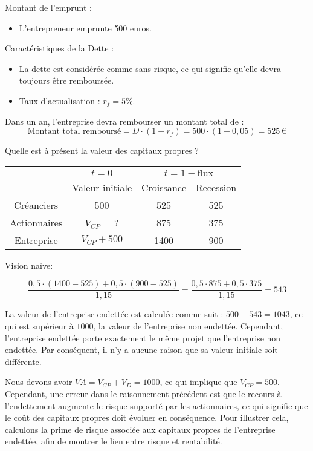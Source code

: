 \documentclass[a4paper, 12pt]{report}
\begin{document}
Montant de l'emprunt : 

\begin{itemize}
	\item L'entrepreneur emprunte 500 euros.
\end{itemize}

Caractéristiques de la Dette : 

\begin{itemize}
	\item La dette est considérée comme sans risque, ce qui signifie qu'elle devra toujours être remboursée.
	\item Taux d'actualisation : \( r_f = 5\% \).
\end{itemize}

Dans un an, l'entreprise devra rembourser un montant total de :
\[
\text{Montant total remboursé} = D \cdot (1 + r_f) = 500 \cdot (1 + 0,05) = 525 \, \text{€}
\]

Quelle est à présent la valeur des capitaux propres ?

\begin{center}
	\begin{tabular}{@{}cccc@{}}
		\toprule
		& $t=0$           & \multicolumn{2}{c}{$t=1-\text{flux}$} \\ \midrule
		& Valeur initiale & Croissance         & Recession        \\ \midrule
		Créanciers   & 500             & 525                & 525              \\
		Actionnaires & $V_{CP}$ = ?    & 875                & 375              \\
		Entreprise   & $V_{CP}+500$    & 1400               & 900              \\ \bottomrule
	\end{tabular}
\end{center}

Vision naïve:

\[ \frac{0,5\cdot(1400-525)+0,5\cdot(900-525)}{1,15}=\frac{0,5\cdot875+0,5\cdot375}{1,15} =543 \]

La valeur de l'entreprise endettée est calculée comme suit : \( 500 + 543 = 1043 \), ce qui est supérieur à \( 1000 \), la valeur de l'entreprise non endettée. Cependant, l'entreprise endettée porte exactement le même projet que l'entreprise non endettée. Par conséquent, il n'y a aucune raison que sa valeur initiale soit différente.


Nous devons avoir \( VA = V_{CP} + V_D = 1000 \), ce qui implique que \( V_{CP} = 500 \). Cependant, une erreur dans le raisonnement précédent est que le recours à l'endettement augmente le risque supporté par les actionnaires, ce qui signifie que le coût des capitaux propres doit évoluer en conséquence. Pour illustrer cela, calculons la prime de risque associée aux capitaux propres de l'entreprise endettée, afin de montrer le lien entre risque et rentabilité.
\end{document}
